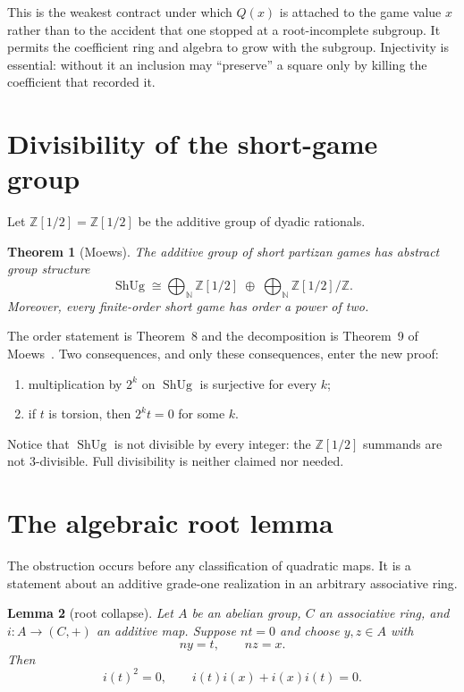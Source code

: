 \documentclass[11pt]{article}
\newtheorem{theorem}{Theorem}
\newtheorem{lemma}[theorem]{Lemma}
\theoremstyle{definition}
\theoremstyle{remark}
\newcommand{\Z}{\mathbb Z}
\newcommand{\D}{\mathbb Z[1/2]}
\newcommand{\ShUg}{\operatorname{ShUg}}
\begin{document}
This is the weakest contract under which $Q(x)$ is attached to the game value
$x$ rather than to the accident that one stopped at a root-incomplete
subgroup.  It permits the coefficient ring and algebra to grow with the
subgroup.  Injectivity is essential: without it an inclusion may ``preserve''
a square only by killing the coefficient that recorded it.

\section{Divisibility of the short-game group}

Let $\D=\Z[1/2]$ be the additive group of dyadic rationals.

\begin{theorem}[Moews]\label{thm:moews}
The additive group of short partizan games has abstract group
structure
\[
 \ShUg\cong\bigoplus_{\mathbb N}\D\;\oplus\;
              \bigoplus_{\mathbb N}\D/\Z.
\]
Moreover, every finite-order short game has order a power of two.
\end{theorem}

The order statement is Theorem~8 and the decomposition is Theorem~9 of
Moews~\cite{moews}.  Two consequences, and only these consequences, enter the
new proof:
\begin{enumerate}[label=(\roman*),leftmargin=2.5em]
\item multiplication by $2^k$ on $\ShUg$ is surjective for every $k$;
\item if $t$ is torsion, then $2^k t=0$ for some $k$.
\end{enumerate}
Notice that $\ShUg$ is not divisible by every integer: the $\D$ summands are
not $3$-divisible.  Full divisibility is neither claimed nor needed.

\section{The algebraic root lemma}

The obstruction occurs before any classification of quadratic maps.  It is a
statement about an additive grade-one realization in an arbitrary associative
ring.

\begin{lemma}[root collapse]\label{lem:root}
Let $A$ be an abelian group, $C$ an associative ring, and
$i:A\to(C,+)$ an additive map.  Suppose $n t=0$ and choose $y,z\in A$ with
\[
 ny=t,\qquad nz=x.
\]
Then
\[
 i(t)^2=0,
 \qquad
 i(t)i(x)+i(x)i(t)=0.
\]
\end{lemma}
\end{document}
